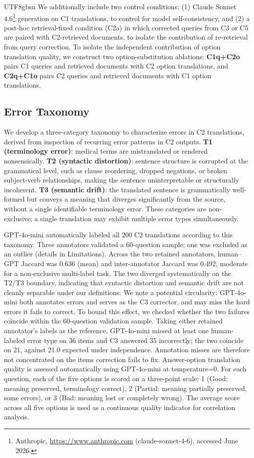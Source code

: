 \documentclass[11pt]{article}
\begin{document}
\begin{CJK}{UTF8}{gbsn}
We additionally include two control conditions: (1) Claude Sonnet 4.6\footnote{Anthropic, \url{https://www.anthropic.com} (claude-sonnet-4-6), accessed June 2026.} generation on C1 translations, to control for model self-consistency, and (2) a post-hoc retrieval-fixed condition (C2a) in which corrected queries from C3 or C5 are paired with
C2-retrieved documents, to isolate the contribution of re-retrieval from query correction. To isolate the independent contribution of option translation quality, we construct two option-substitution ablations: \textbf{C1q+C2o} pairs C1 queries and retrieved documents with C2 option translations, and \textbf{C2q+C1o} pairs C2 queries and retrieved documents with C1 option translations.

\subsection{Error Taxonomy}
\label{sec:taxonomy}
We develop a three-category taxonomy to characterize errors in C2 translations, derived from inspection of recurring error patterns in C2 outputs. \textbf{T1 (terminology error)}: medical terms are mistranslated or rendered nonsensically. \textbf{T2 (syntactic distortion)}: sentence structure is corrupted at the grammatical level, such as clause reordering, dropped negations, or broken subject-verb relationships, making the sentence uninterpretable or structurally incoherent. \textbf{T3 (semantic drift)}: the translated sentence is grammatically well-formed but conveys a meaning that diverges significantly from the source, without a single identifiable terminology error. These categories are non-exclusive; a single translation may exhibit multiple error types simultaneously.

GPT-4o-mini automatically labeled all 200 C2 translations according to this taxonomy. Three annotators validated a 60-question sample; one was excluded as an outlier (details in Limitations). Across the two retained annotators, human--GPT Jaccard was 0.636 (mean) and inter-annotator Jaccard was 0.492, moderate for a non-exclusive multi-label task. The two diverged systematically on the T2/T3 boundary, indicating that syntactic distortion and semantic drift are not cleanly separable under our definitions. We note a potential circularity: GPT-4o-mini both annotates errors and serves as the C3 corrector, and may miss the hard errors it fails to correct. To bound this effect, we checked whether the two failures coincide within the 60-question validation sample. Taking either retained annotator's labels as the reference, GPT-4o-mini missed at least one human-labeled error type on 36 items and C3 answered 35 incorrectly; the two coincide on 21, against 21.0 expected under independence. Annotation misses are therefore not concentrated on the items correction fails to fix. Answer-option translation quality is assessed automatically using GPT-4o-mini at temperature=0. For each question, each of the five options is scored on a three-point scale: 1 (Good: meaning preserved, terminology correct), 2 (Partial: meaning partially preserved, some errors), or 3 (Bad: meaning lost or completely wrong). The average score across all five options is used as a continuous quality indicator for correlation analysis.


\end{CJK}
\end{document}
